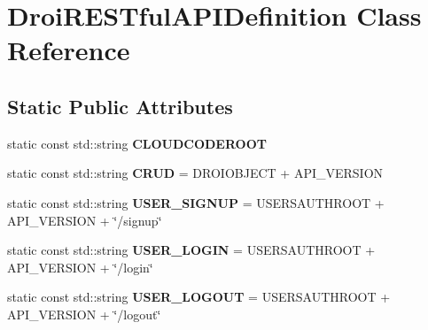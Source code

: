 \hypertarget{class_droi_r_e_s_tful_a_p_i_definition}{}\section{Droi\+R\+E\+S\+Tful\+A\+P\+I\+Definition Class Reference}
\label{class_droi_r_e_s_tful_a_p_i_definition}
\subsection*{Static Public Attributes}
\begin{DoxyCompactItemize}
\item 
\mbox{\label{class_droi_r_e_s_tful_a_p_i_definition_aa5dd71efc1edc68ab0ba97844c7fef29}} 
static const std\+::string {\bfseries C\+L\+O\+U\+D\+C\+O\+D\+E\+R\+O\+OT}
\item 
\mbox{\label{class_droi_r_e_s_tful_a_p_i_definition_a3f34db345e8e0d514c7c4d1e4323d283}} 
static const std\+::string {\bfseries C\+R\+UD} = D\+R\+O\+I\+O\+B\+J\+E\+CT + A\+P\+I\+\_\+\+V\+E\+R\+S\+I\+ON
\item 
\mbox{\label{class_droi_r_e_s_tful_a_p_i_definition_ae08bc9690aecb037ca02b6ae2a6ed171}} 
static const std\+::string {\bfseries U\+S\+E\+R\+\_\+\+S\+I\+G\+N\+UP} = U\+S\+E\+R\+S\+A\+U\+T\+H\+R\+O\+OT + A\+P\+I\+\_\+\+V\+E\+R\+S\+I\+ON + \char`\"{}/signup\char`\"{}
\item 
\mbox{\label{class_droi_r_e_s_tful_a_p_i_definition_a050454cd270acba2416806c7f7c3b735}} 
static const std\+::string {\bfseries U\+S\+E\+R\+\_\+\+L\+O\+G\+IN} = U\+S\+E\+R\+S\+A\+U\+T\+H\+R\+O\+OT + A\+P\+I\+\_\+\+V\+E\+R\+S\+I\+ON + \char`\"{}/login\char`\"{}
\item 
\mbox{\label{class_droi_r_e_s_tful_a_p_i_definition_a71011afbcc63bd20b4e2eb79b3dca321}} 
static const std\+::string {\bfseries U\+S\+E\+R\+\_\+\+L\+O\+G\+O\+UT} = U\+S\+E\+R\+S\+A\+U\+T\+H\+R\+O\+OT + A\+P\+I\+\_\+\+V\+E\+R\+S\+I\+ON + \char`\"{}/logout\char`\"{}
\item 
\mbox{\label{class_droi_r_e_s_tful_a_p_i_definition_a5210275a888581b1855f9511cd837ef0}} 

\end{DoxyCompactItemize}
